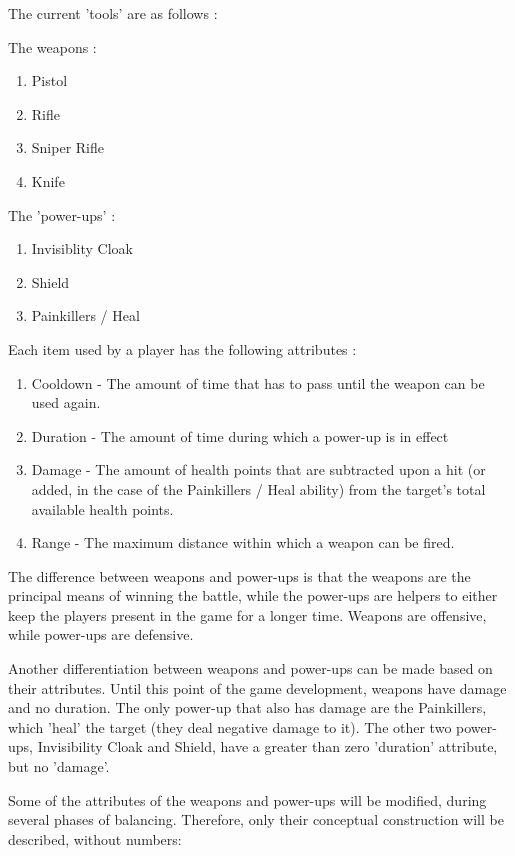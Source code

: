 The current 'tools' are as follows :\newline

The weapons : 
\begin{enumerate}
  \item Pistol
  \item Rifle
  \item Sniper Rifle
  \item Knife   
\end{enumerate}

The 'power-ups' :
\begin{enumerate}
  \item Invisiblity Cloak
  \item Shield
  \item Painkillers / Heal
\end{enumerate}

Each item used by a player has the following attributes : 
\begin{enumerate}
  \item Cooldown - The amount of time that has to pass until the weapon can be
  used again.
  \item Duration - The amount of time during which a power-up is in effect 
  \item Damage - The amount of health points that are subtracted upon a hit (or
  added, in the case of the Painkillers / Heal ability) from the target's total
  available health points.
  \item Range - The maximum distance within which a weapon can be fired.
\end{enumerate}

The difference between weapons and power-ups is that the weapons are the
principal means of winning the battle, while the power-ups are helpers to either
keep the players present in the game for a longer time. Weapons are offensive,
while power-ups are defensive.\newline

Another differentiation between weapons and power-ups can be made based on their
attributes. Until this point of the game development, weapons have damage and no
duration. The only power-up that also has damage are the Painkillers, which
'heal' the target (they deal negative damage to it). The other two power-ups,
Invisibility Cloak and Shield, have a greater than zero 'duration' attribute,
but no 'damage'.\newline

Some of the attributes of the weapons and power-ups will be modified, during
several phases of balancing. Therefore, only their conceptual construction will
be described, without numbers:

